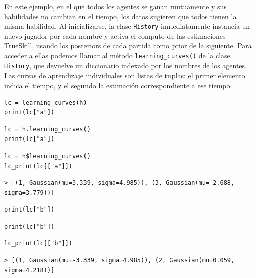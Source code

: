 \documentclass[a4paper,11pt]{book}
\theoremstyle{definition}
\begin{document}
En este ejemplo, en el que todos los agentes se ganan mutuamente y sus habilidades no cambian en el tiempo, los datos sugieren que todos tienen la misma habilidad.
%
Al inicializarse, la clase \texttt{History} inmediatamente instancia un nuevo jugador por cada nombre y activa el computo de las estimaciones TrueSkill, usando los posteriors de cada partida como prior de la siguiente.
%
Para acceder a ellas podemos llamar al método \texttt{learning\_curves()} de la clase \texttt{History}, que devuelve un diccionario indexado por los nombres de los agentes.
%
Las curvas de aprendizaje individuales son listas de tuplas: el primer elemento indica el tiempo, y el segundo la estimación correspondiente a ese tiempo.
%
\begin{paracol}{3}
\begin{lstlisting}[backgroundcolor=\color{julia!60}, belowskip=-0.77 \baselineskip]
lc = learning_curves(h)
print(lc["a"])
\end{lstlisting}
  \switchcolumn
\begin{lstlisting}[backgroundcolor=\color{python!60}, belowskip=-0.77 \baselineskip]
lc = h.learning_curves()
print(lc["a"])
\end{lstlisting}
   \switchcolumn
\begin{lstlisting}[backgroundcolor=\color{r!50}, belowskip=-0.77 \baselineskip]
lc = h$learning_curves()
lc_print(lc[["a"]])
\end{lstlisting}
\end{paracol}
\begin{lstlisting}[backgroundcolor=\color{all}, belowskip=-0.77 \baselineskip]
> [(1, Gaussian(mu=3.339, sigma=4.985)), (3, Gaussian(mu=-2.688, sigma=3.779))]
\end{lstlisting}
\begin{paracol}{3}
\begin{lstlisting}[backgroundcolor=\color{julia!60}, belowskip=-0.77 \baselineskip]
print(lc["b"])
\end{lstlisting}
  \switchcolumn
\begin{lstlisting}[backgroundcolor=\color{python!60}, belowskip=-0.77 \baselineskip]
print(lc["b"])
\end{lstlisting}
   \switchcolumn
\begin{lstlisting}[backgroundcolor=\color{r!50}, belowskip=-0.77 \baselineskip]
lc_print(lc[["b"]])
\end{lstlisting}
\end{paracol}
\begin{lstlisting}[captionpos=b,backgroundcolor=\color{all},label=lst:trueskill, caption={Curvas de aprendizaje de los jugadores que participan en una secuencia de eventos},belowskip=0cm]
> [(1, Gaussian(mu=-3.339, sigma=4.985)), (2, Gaussian(mu=0.059, sigma=4.218))]
\end{lstlisting}
\end{document}

